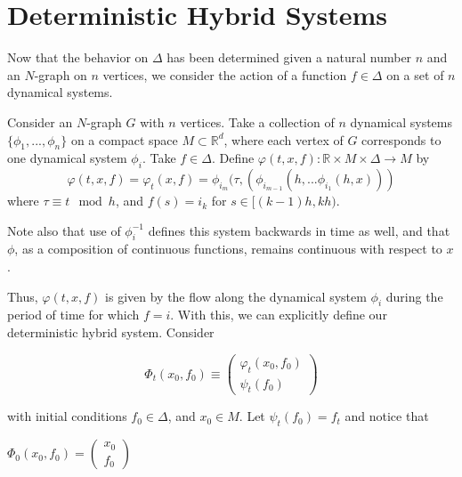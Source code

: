 \documentclass[11pt]{article}
\begin{document}
\section{Deterministic Hybrid Systems}
Now that the behavior on $\Delta$ has been determined given a natural number $n$ and an $N$-graph on $n$ vertices, we consider the action of a function $f\in\Delta$ on a set of $n$ dynamical systems.


Consider an $N$-graph $G$ with $n$ vertices.  Take a collection of $n$ dynamical systems $\{\phi_1,...,\phi_n\}$ on a compact space $M \subset \mathbb{R}^d$, where each vertex of $G$ corresponds to one dynamical system $\phi_i$.  Take $f \in \Delta$.  Define $\varphi(t,x,f):\mathbb{R} \times M \times \Delta \rightarrow M$ by
$$
\varphi (t,x,f) = \varphi_t(x,f)= \phi_{i_m}(\tau,(\phi_{i_{m-1}}(h,...\phi_{i_{1}}(h,x))) 
$$
where $\tau\equiv t \mod h$, and $f(s)=i_k$ for $s\in [(k-1)h,kh)$. 

Note also that use of $\phi_i^{-1}$ defines this system backwards in time as well, and that $\phi$, as a composition of continuous functions, remains continuous with respect to $x$. 



Thus, $\varphi(t,x,f)$ is given by the flow along the dynamical system $\phi_i$ during the period of time for which $f = i$.  With this, we can explicitly define our deterministic hybrid system.  Consider 

\begin{equation}\label{dynsys}
\Phi_t(x_0,f_0) \equiv \left (
\begin{array}{cc}
\varphi_t(x_0,f_0) \\
\psi_t(f_0)
\end{array} \right ) 
\end{equation}

with initial conditions $f_0 \in \Delta$, and $x_0\in M$.  Let $\psi_t(f_0) = f_t$ and notice that

\begin{center}
$\Phi_0(x_0,f_0) = \left (
\begin{array}{cc}
x_0 \\
f_0
\end{array} \right ) $
\end{center}
\end{document}
